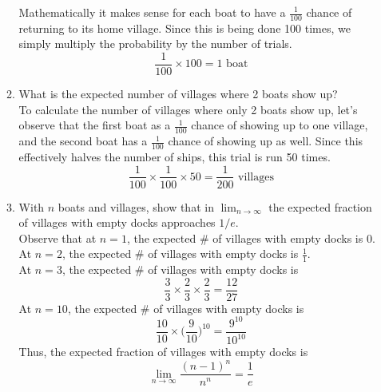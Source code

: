 \documentclass{article}
\begin{document}
\begin{enumerate}
\begin{enumerate}[label=\arabic*.]
                    Mathematically it makes sense for each boat to have a \(\frac{1}{100}\) chance of returning to its home village. Since this is being done 100 times, we simply multiply the probability by the number of trials.
                    \begin{equation*}
                        \frac{1}{100} \times 100 = 1 \text{ boat}
                    \end{equation*}
              \item What is the expected number of villages where 2 boats show up? \\
                    To calculate the number of villages where only 2 boats show up, let's observe that the first boat as a \(\frac{1}{100}\) chance of showing up to one village, and the second boat has a \(\frac{1}{100}\) chance of showing up as well.
                    Since this effectively halves the number of ships, this trial is run 50 times.
                    \begin{equation*}
                        \frac{1}{100} \times \frac{1}{100} \times 50 = \frac{1}{200} \text{ villages}
                    \end{equation*}
              \item With \(n\) boats and villages, show that in \(\lim_{n \to \infty}\) the expected fraction of villages with empty docks approaches \(1 / e\). \\
                    Observe that at \(n = 1\), the expected \# of villages with empty docks is 0. \\
                    At \(n = 2\), the expected \# of villages with empty docks is \(\frac{1}{1}\). \\
                    At \(n = 3\), the expected \# of villages with empty docks is
                    \begin{equation*}
                        \frac{3}{3} \times \frac{2}{3} \times \frac{2}{3} = \frac{12}{27}
                    \end{equation*}
                    At \(n = 10\), the expected \# of villages with empty docks is
                    \begin{equation*}
                        \frac{10}{10} \times \biggl(\frac{9}{10}\biggr)^{10} = \frac{9^{10}}{10^{10}}
                    \end{equation*}
                    Thus, the expected fraction of villages with empty docks is
                    \begin{equation*}
                        \lim_{n \to \infty} \frac{(n - 1)^n}{n^n} = \frac{1}{e}

\end{equation*}
\end{enumerate}
\end{enumerate}
\end{document}
